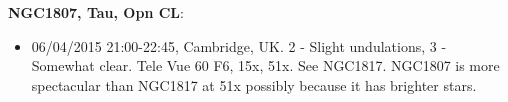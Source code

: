 {\bf NGC1807, Tau, Opn CL}:
\begin{itemize}
\item 06/04/2015 21:00-22:45, Cambridge, UK. 2 - Slight undulations, 3 - Somewhat clear. Tele Vue 60 F6, 15x, 51x. See NGC1817. NGC1807 is more spectacular than NGC1817 at 51x possibly because it has brighter stars. 
\end{itemize}
